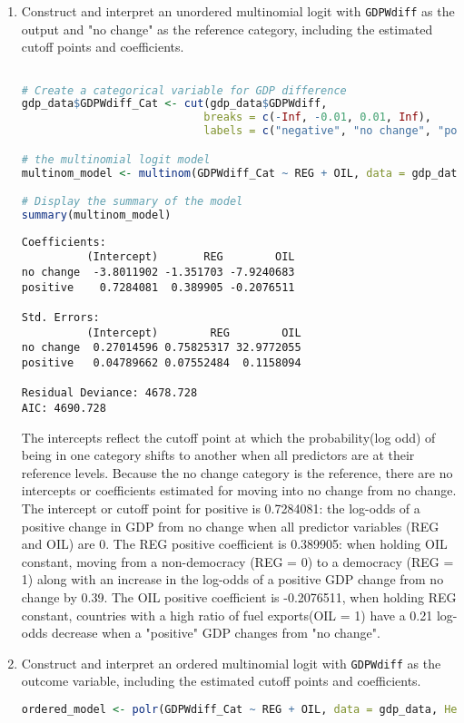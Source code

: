 \documentclass[12pt,letterpaper]{article}
\begin{document}
\begin{enumerate}
	\item Construct and interpret an unordered multinomial logit with \texttt{GDPWdiff} as the output and "no change" as the reference category, including the estimated cutoff points and coefficients.

 \begin{lstlisting}[language=R] 

# Create a categorical variable for GDP difference
gdp_data$GDPWdiff_Cat <- cut(gdp_data$GDPWdiff,
                            breaks = c(-Inf, -0.01, 0.01, Inf),
                            labels = c("negative", "no change", "positive"))

# the multinomial logit model 
multinom_model <- multinom(GDPWdiff_Cat ~ REG + OIL, data = gdp_data, ref = "no change")

# Display the summary of the model
summary(multinom_model)
\end{lstlisting} 
\begin{verbatim}
Coefficients:
          (Intercept)       REG        OIL
no change  -3.8011902 -1.351703 -7.9240683
positive    0.7284081  0.389905 -0.2076511

Std. Errors:
          (Intercept)        REG        OIL
no change  0.27014596 0.75825317 32.9772055
positive   0.04789662 0.07552484  0.1158094

Residual Deviance: 4678.728 
AIC: 4690.728 
\end{verbatim}

The intercepts reflect the cutoff point at which the probability(log odd) of being in one category shifts to another when all predictors are at their reference levels. Because the no change category is the reference, there are no intercepts or coefficients estimated for moving into no change from no change.   The intercept or cutoff point for positive is  0.7284081: the log-odds of a positive change in GDP from no change when all predictor variables (REG and OIL) are 0. The REG positive coefficient is 0.389905: when holding OIL constant, moving from a non-democracy (REG = 0) to a democracy (REG = 1) along with an increase in the log-odds of a positive GDP change from no change by 0.39.
The OIL positive coefficient is -0.2076511, when holding REG constant, countries with a high ratio of fuel exports(OIL = 1) have a 0.21 log-odds decrease when a "positive" GDP changes from "no change".

\item Construct and interpret an ordered multinomial logit with \texttt{GDPWdiff} as the outcome variable, including the estimated cutoff points and coefficients.
\begin{lstlisting}[language=R] 
ordered_model <- polr(GDPWdiff_Cat ~ REG + OIL, data = gdp_data, Hess=TRUE)


\end{lstlisting}
\end{enumerate}
\end{document}
